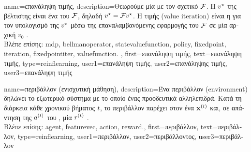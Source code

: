 {name={\foreignlanguage{greek}{επανάληψη τιμής}},
	description={\foreignlanguage{greek}{Θεωρούμε μία}  \foreignlanguage{greek}{με τον 
		σχετικό}  $\mathcal{F}$. \foreignlanguage{greek}{Η} 
		 $v^\star$ \foreignlanguage{greek}{της βέλτιστης}  
		\foreignlanguage{greek}{είναι ένα}  \foreignlanguage{greek}{του $\mathcal{F}$, 
		δηλαδή $v^\star = \mathcal{F} v^\star$. Η}  \foreignlanguage{greek}{τιμής} 
		(value iteration) \foreignlanguage{greek}{είναι η}  
		\foreignlanguage{greek}{για τον υπολογισμό της $v^\star$ μέσω της επαναλαμβανόμενης εφαρμογής 
		του $\mathcal{F}$ σε μία αρχική}  $v_{0}$ \cite[\foreignlanguage{greek}{Ενότητα} 4.4]{SuttonEd2}.
		\\
		\foreignlanguage{greek}{Βλέπε επίσης:} \gls{mdp}, \gls{bellmanoperator}, \gls{statevaluefunction}, \gls{policy}, 
		\gls{fixedpoint}, \gls{iteration}, \gls{fixedpointiter}, \gls{valuefunction}. }, 
	first={\foreignlanguage{greek}{επανάληψη τιμής}},
	text={\foreignlanguage{greek}{επανάληψη τιμής}},
	type=reinflearning,
	user1={\foreignlanguage{greek}{επανάληψη τιμής}}, %
  	user2={\foreignlanguage{greek}{επανάληψης τιμής}}, %
	user3={\foreignlanguage{greek}{επανάληψη τιμής}} %
}

{name={\foreignlanguage{greek}{περιβάλλον (ενισχυτική μάθηση)}},
	description={\foreignlanguage{greek}{Ένα περιβάλλον} (environment) 
		\foreignlanguage{greek}{δηλώνει το εξωτερικό σύστημα με το οποίο ένας}  
		\foreignlanguage{greek}{προοδευτικά αλληλεπιδρά. Κατά τη διάρκεια κάθε χρονικού βήματος $t$, 
		το περιβάλλον παρέχει στον}  \foreignlanguage{greek}{ένα}  ${\bf x}^{(t)}$ 
		\foreignlanguage{greek}{και, σε απάντηση της}  $a^{(t)}$ \foreignlanguage{greek}{του} 
		, \foreignlanguage{greek}{μία}  $r^{(t)}$ \cite{SuttonEd2}.
		\\ 
		\foreignlanguage{greek}{Βλέπε επίσης:} \gls{agent}, \gls{featurevec}, \gls{action}, \gls{reward}.},
	first={\foreignlanguage{greek}{περιβάλλον}},
	text={\foreignlanguage{greek}{περιβάλλον}},
	type=reinflearning,
	user1={\foreignlanguage{greek}{περιβάλλον}}, %
  	user2={\foreignlanguage{greek}{περιβάλλοντος}}, %
	user3={\foreignlanguage{greek}{περιβάλλον}} %
}

